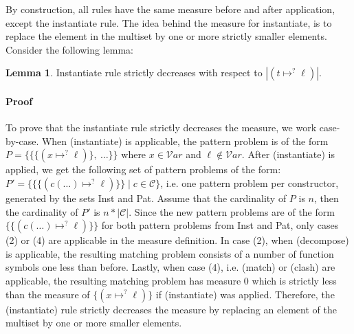\documentclass{report}
\theoremstyle{definition}
\newtheorem{lemma_inner}{Lemma}
\newenvironment{lemma}
  {\begin{customblock}\begin{lemma_inner}}
  {\end{lemma_inner}\end{customblock}}
\begin{document}
By construction, all rules have the same measure before and after application, except the instantiate rule. The idea behind the measure for instantiate, is to replace the element in the multiset by one or more strictly smaller elements. Consider the following lemma:

\begin{lemma}\label{lemma:termination}
Instantiate rule strictly decreases with respect to $|(t\mapsto^? \ell)|$.

\paragraph{Proof} To prove that the instantiate rule strictly decreases the measure, we work case-by-case. When (instantiate) is applicable, the pattern problem is of the form $P = \{\{\{(x\mapsto^? \ell)\},\ \dots\}\}$ where $x \in \mathcal{V}ar$ and $\ell \notin \mathcal{V}ar$. After (instantiate) is applied, we get the following set of pattern problems of the form: $P' = \{\{\{(c(\dots)\mapsto^? \ell)\}\} \mid c \in \mathcal{C}\}$, i.e. one pattern problem per constructor, generated by the sets Inst and Pat. Assume that the cardinality of $P$ is $n$, then the cardinality of $P'$ is $n * \lvert \mathcal{C} \rvert$. Since the new pattern problems are of the form $\{\{(c(\dots)\mapsto^? \ell)\}\}$ for both pattern problems from Inst and Pat, only cases (2) or (4) are applicable in the measure definition. In case (2), when (decompose) is applicable, the resulting matching problem consists of a number of function symbols one less than before. Lastly, when case (4), i.e. (match) or (clash) are applicable, the resulting matching problem has measure $0$ which is strictly less than the measure of $\{(x\mapsto^? \ell)\}$ if (instantiate) was applied. Therefore, the (instantiate) rule strictly decreases the measure by replacing an element of the multiset by one or more smaller elements.
\end{lemma}
\end{document}

